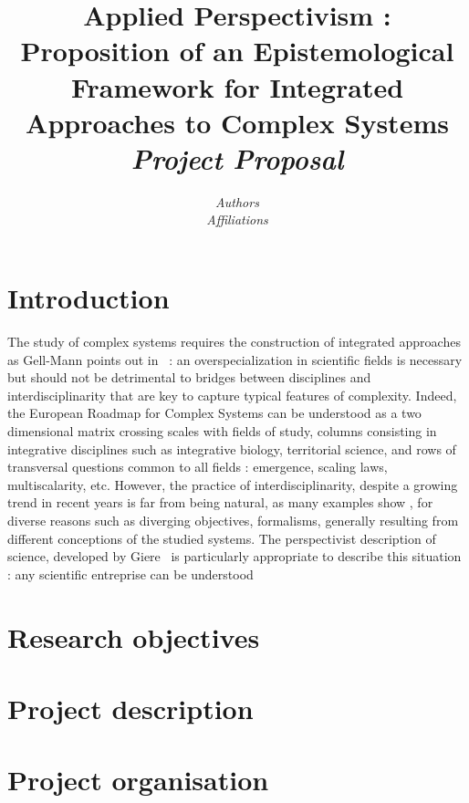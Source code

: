 


\title{
Applied Perspectivism : Proposition of an Epistemological Framework for Integrated Approaches to Complex Systems
\bigskip\\
\textit{Project Proposal}
}
\author{\textit{Authors}\medskip\\
\textit{Affiliations}
}
\date{}


\maketitle

\justify


\begin{abstract}

\end{abstract}


\section{Introduction}

The study of complex systems requires the construction of integrated approaches as Gell-Mann points out in~\cite{}%
 : an overspecialization in scientific fields is necessary but should not be detrimental to bridges between disciplines and interdisciplinarity that are key to capture typical features of complexity. Indeed, the European Roadmap for Complex Systems can be understood as a two dimensional matrix crossing scales with fields of study, columns consisting in integrative disciplines such as integrative biology, territorial science, %
 and rows of transversal questions common to all fields : emergence, scaling laws, multiscalarity, etc. %
 However, the practice of interdisciplinarity, despite a growing trend in recent years %
 is far from being natural, as many examples show %
 , for diverse reasons such as diverging objectives, formalisms, generally resulting from different conceptions of the studied systems.
 The perspectivist description of science, developed by Giere~\cite{}%
 is particularly appropriate to describe this situation : any scientific entreprise can be understood



\section{Research objectives}


\section{Project description}




\section{Project organisation}



















